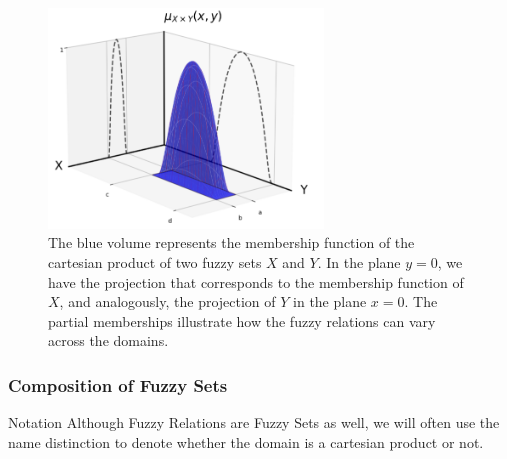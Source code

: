 \begin{figure}[ht]
    \centering
    \includegraphics[width=0.65\textwidth]{ch1/figures/fuzzy_cart_prod.png}
    \caption{The blue volume represents the membership function of the cartesian product of two fuzzy sets $X$ and $Y$. In the plane $y=0$, we have the projection that corresponds to the membership function of $X$, and analogously, the projection of $Y$ in the plane $x=0$. The partial memberships illustrate how the fuzzy relations can vary across the domains.}
    \label{fig:fuzzy_cart_prod}
\end{figure}


\subsubsection*{Composition of Fuzzy Sets}
\begin{notation}[label={not:compositionFS}]{Notation}
    Although Fuzzy Relations are Fuzzy Sets as well, we will often use the name distinction to denote whether the domain is a cartesian product or not.
  \end{notation}



